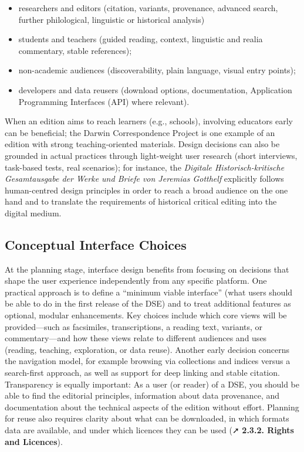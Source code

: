 \documentclass[
  letterpaper,
  DIV=11,
  numbers=noendperiod]{scrreprt}
\begin{document}
\begin{itemize}
\item
  researchers and editors (citation, variants, provenance, advanced
  search, further philological, linguistic or historical analysis)
\item
  students and teachers (guided reading, context, linguistic and realia
  commentary, stable references);
\item
  non-academic audiences (discoverability, plain language, visual entry
  points);
\item
  developers and data reusers (download options, documentation,
  Application Programming Interfaces (API) where relevant).
\end{itemize}

When an edition aims to reach learners (e.g., schools), involving
educators early can be beneficial; the Darwin Correspondence Project is
one example of an edition with strong teaching-oriented materials.
Design decisions can also be grounded in actual practices through
light-weight user research (short interviews, task-based tests, real
scenarios); for instance, the \emph{Digitale Historisch-kritische
Gesamtausgabe der Werke und Briefe von Jeremias Gotthelf} explicitly
follows human-centred design principles in order to reach a broad
audience on the one hand and to translate the requirements of historical
critical editing into the digital medium.

\subsection{Conceptual Interface
Choices}\label{conceptual-interface-choices}

At the planning stage, interface design benefits from focusing on
decisions that shape the user experience independently from any specific
platform. One practical approach is to define a ``minimum viable
interface'' (what users should be able to do in the first release of the
DSE) and to treat additional features as optional, modular enhancements.
Key choices include which core views will be provided---such as
facsimiles, transcriptions, a reading text, variants, or
commentary---and how these views relate to different audiences and uses
(reading, teaching, exploration, or data reuse). Another early decision
concerns the navigation model, for example browsing via collections and
indices versus a search-first approach, as well as support for deep
linking and stable citation. Transparency is equally important: As a
user (or reader) of a DSE, you should be able to find the editorial
principles, information about data provenance, and documentation about
the technical aspects of the edition without effort. Planning for reuse
also requires clarity about what can be downloaded, in which formats
data are available, and under which licences they can be used (➚
\textbf{2.3.2. Rights and Licences}).
\end{document}
